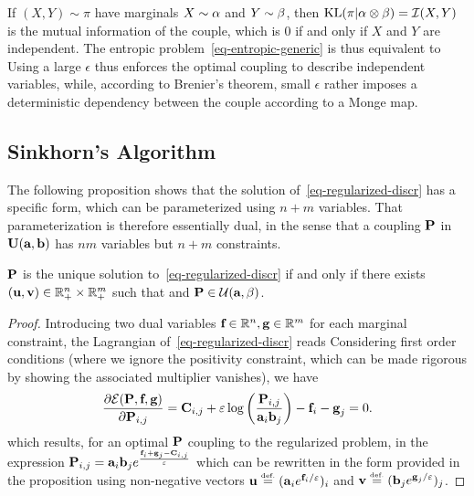 \begin{rem}
	If $(X,Y) \sim \pi$ have marginals $X \sim \al$ and $Y \sim \be$, then $\KL(\pi|\al \otimes \be) = \Ii(X,Y)$ is the mutual information of the couple, which is 0 if and only if $X$ and $Y$ are independent. The entropic problem~\eqref{eq-entropic-generic} is thus equivalent to
	Using a large $\epsilon$ thus enforces the optimal coupling to describe independent variables, while, according to Brenier's theorem, small $\epsilon$ rather imposes a deterministic dependency between the couple according to a Monge map. 
\end{rem}


\subsection{Sinkhorn's Algorithm}

The following proposition shows that the solution of~\eqref{eq-regularized-discr} has a specific form, which can be parameterized using $n+m$ variables. That parameterization is therefore essentially dual, in the sense that a coupling $\P$ in $\CouplingsD(\a,\b)$ has $nm$ variables but $n+m$ constraints.

\begin{prop}\label{prop-regularized-primal}
$\P$ is the unique solution to~\eqref{eq-regularized-discr} if and only if there exists  $(\uD,\vD) \in \RR_+^n \times \RR_+^m$ such that 
and $\P \in \Couplings(\a,\be)$.
\end{prop} 

\begin{proof} 
Introducing two dual variables $\fD\in\RR^n,\gD\in\RR^m$ for each marginal constraint, the Lagrangian of~\eqref{eq-regularized-discr} reads
Considering first order conditions (where we ignore the positivity constraint, which can be made rigorous by showing the associated multiplier vanishes), we have
$$
	\frac{\partial\Lag(\P,\fD,\gD)}{\partial \P_{i,j}}= \C_{i,j} + \epsilon \log\pa{\frac{\P_{i,j}}{\a_i \b_j}} - \fD_i -\gD_j = 0.
$$
which results, for an optimal $\P$ coupling to the regularized problem, in the expression 
$\P_{i,j}=\a_i \b_j e^{\frac{\fD_i+\gD_j - \C_{i,j}}{\epsilon}}$ 
which can be rewritten in the form provided in the proposition using non-negative vectors $\uD \eqdef (\a_i e^{\fD_i/\varepsilon})_i$ and $\vD \eqdef (\b_j e^{\gD_j/\varepsilon})_j$.
\end{proof} 

